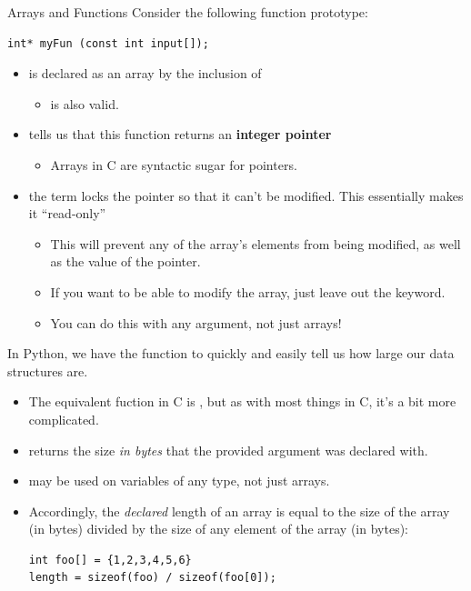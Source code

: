 \documentclass[11pt]{beamer}
\let\OldTexttt\texttt
\renewcommand{\texttt}[1]{\OldTexttt{\color{teal}{#1}}}
\begin{document}
\begin{frame}[fragile=singleslide]{Arrays and Functions}
Consider the following function prototype:
\begin{lstlisting}[style=C]
int* myFun (const int input[]);
\end{lstlisting}
\begin{itemize}
\item \texttt{input} is declared as an array by the inclusion of \texttt{[]}
\begin{itemize}
\item \texttt{int*} is also valid.
\end{itemize}
\item \texttt{int*} tells us that this function returns an \textbf{integer pointer}
\begin{itemize}
\item Arrays in C are syntactic sugar for pointers.
\end{itemize}
\item the \texttt{const} term locks the pointer so that it can't be modified.  This essentially makes it ``read-only''
\begin{itemize}
\item This will prevent any of the array's elements from being modified, as well as the value of the pointer.  
\item If you want to be able to modify the array, just leave out the \texttt{const} keyword.
\item You can do this with any argument, not just arrays!
\end{itemize}
\end{itemize}
\end{frame}

\begin{frame}[fragile=singleslide]{\texttt{sizeof}}
In Python, we have the \texttt{len()} function to quickly and easily tell us how large our data structures are.  
\begin{itemize}
\item The equivalent fuction in C is \texttt{sizeof()}, but as with most things in C, it's a bit more complicated.
\item \texttt{sizeof()} returns the size \emph{in bytes} that the provided argument was declared with.   
\item \texttt{sizeof()} may be used on variables of any type, not just arrays.
\item Accordingly, the \emph{declared} length of an array is equal to the size of the array (in bytes) divided by the size of any element of the array (in bytes):
\begin{lstlisting}[style=C]
int foo[] = {1,2,3,4,5,6}
length = sizeof(foo) / sizeof(foo[0]);
\end{lstlisting}
\end{itemize}
\end{frame}
\end{document}
